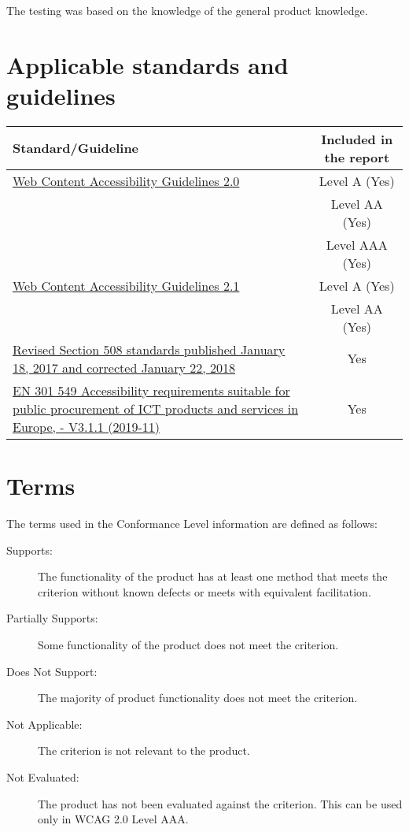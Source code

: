 \documentclass{report}
\begin{document}
The testing was based on the knowledge of the general product
knowledge.

\section{Applicable standards and guidelines}
\label{sec:standards}

{\centering
\begin{tabularx}{\textwidth}{Xc}
  \toprule
  Standard/Guideline  & Included in the report\\
  \midrule
  \href{http://www.w3.org/TR/2008/REC-WCAG20-20081211}{Web Content
  Accessibility Guidelines 2.0} & Level A (Yes) \\
                      & Level AA (Yes)\\
                      & Level AAA (Yes)\\
  \href{https://www.w3.org/TR/WCAG21}{Web Content Accessibility
  Guidelines 2.1} & Level A (Yes) \\
  & Level AA (Yes)\\
  \href{https://www.access-board.gov/guidelines-and-standards/communications-and-it/about-the-ict-refresh/final-rule/text-of-the-standards-and-guidelines}{Revised Section 508 standards published January 18, 2017 and
  corrected January 22, 2018} & Yes\\
  \href{https://www.etsi.org/deliver/etsi_en/301500_301599/301549/03.01.01_60/en_301549v030101p.pdf}{EN
  301 549 Accessibility requirements suitable for public procurement
  of ICT products and services in Europe, - V3.1.1 (2019-11)} & Yes\\
  \bottomrule
\end{tabularx}
\par}

\section{Terms}
\label{sec:terms}

The terms used in the Conformance Level information are defined as follows:
\begin{description}
\item[Supports:] The functionality of the product has at least one
  method that meets the criterion without known defects or meets with
  equivalent facilitation.
\item[Partially Supports:] Some functionality of the product does not
  meet the criterion.
\item[Does Not Support:] The majority of product functionality does
  not meet the criterion.
\item[Not Applicable:] The criterion is not relevant to the product.
\item[Not Evaluated:] The product has not been evaluated against the
  criterion. This can be used only in WCAG 2.0 Level AAA.

\end{description}
\end{document}
